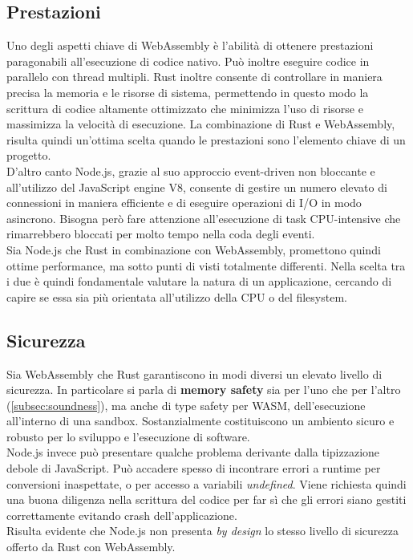 \subsection{Prestazioni}
Uno degli aspetti chiave di WebAssembly è l'abilità di ottenere prestazioni paragonabili all'esecuzione di codice nativo.
Può inoltre eseguire codice in parallelo con thread multipli.
Rust inoltre consente di controllare in maniera precisa la memoria e le risorse di sistema, permettendo in questo modo la scrittura di codice altamente ottimizzato che minimizza l'uso di risorse e massimizza la velocità di esecuzione.
La combinazione di Rust e WebAssembly, risulta quindi un'ottima scelta quando le prestazioni sono l'elemento chiave di un progetto.
\\D'altro canto Node.js, grazie al suo approccio event-driven non bloccante e all'utilizzo del JavaScript engine V8, consente di gestire un numero elevato di connessioni in maniera efficiente e di eseguire operazioni di I/O in modo asincrono.
Bisogna però fare attenzione all'esecuzione di task CPU-intensive che rimarrebbero bloccati per molto tempo nella coda degli eventi.
\\Sia Node.js che Rust in combinazione con WebAssembly, promettono quindi ottime performance, ma sotto punti di visti totalmente differenti.
Nella scelta tra i due è quindi fondamentale valutare la natura di un applicazione, cercando di capire se essa sia più orientata all'utilizzo della CPU o del filesystem.
\subsection{Sicurezza}
Sia WebAssembly che Rust garantiscono in modi diversi un elevato livello di sicurezza. In particolare si parla di \textbf{memory safety} sia per l'uno che per l'altro (\ref{subsec:soundness}), ma anche di type safety per WASM, dell'esecuzione all'interno di una sandbox. 
Sostanzialmente costituiscono un ambiento sicuro e robusto per lo sviluppo e l'esecuzione di software.
\\Node.js invece può presentare qualche problema derivante dalla tipizzazione debole di JavaScript. Può accadere spesso di incontrare errori a runtime per conversioni inaspettate, o per accesso a variabili \emph{undefined}.
Viene richiesta quindi una buona diligenza nella scrittura del codice per far sì che gli errori siano gestiti correttamente evitando crash dell'applicazione.
\\Risulta evidente che Node.js non presenta \emph{by design} lo stesso livello di sicurezza offerto da Rust con WebAssembly.
